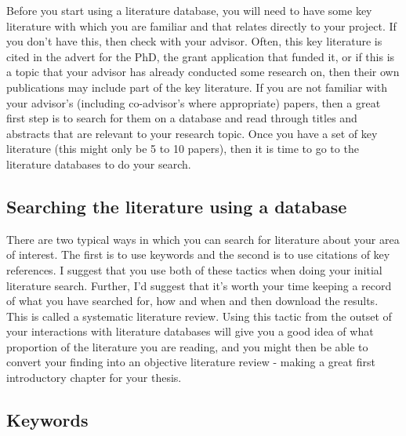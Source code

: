 \documentclass[
]{krantz}
\begin{document}
Before you start using a literature database, you will need to have some key literature with which you are familiar and that relates directly to your project. If you don't have this, then check with your advisor. Often, this key literature is cited in the advert for the PhD, the grant application that funded it, or if this is a topic that your advisor has already conducted some research on, then their own publications may include part of the key literature. If you are not familiar with your advisor's (including co-advisor's where appropriate) papers, then a great first step is to search for them on a database and read through titles and abstracts that are relevant to your research topic. Once you have a set of key literature (this might only be 5 to 10 papers), then it is time to go to the literature databases to do your search.

\hypertarget{searching-the-literature-using-a-database}{%
\subsection{Searching the literature using a database}\label{searching-the-literature-using-a-database}}

There are two typical ways in which you can search for literature about your area of interest. The first is to use keywords and the second is to use citations of key references. I suggest that you use both of these tactics when doing your initial literature search. Further, I'd suggest that it's worth your time keeping a record of what you have searched for, how and when and then download the results. This is called a systematic literature review. Using this tactic from the outset of your interactions with literature databases will give you a good idea of what proportion of the literature you are reading, and you might then be able to convert your finding into an objective literature review - making a great first introductory chapter for your thesis.

\hypertarget{keywords}{%
\subsection{Keywords}\label{keywords}}
\end{document}
